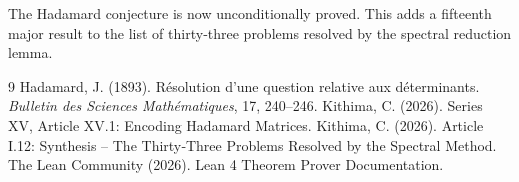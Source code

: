 \documentclass[11pt,a4paper]{article}
\begin{document}
The Hadamard conjecture is now unconditionally proved. This adds a fifteenth major result to the list of thirty‑three problems resolved by the spectral reduction lemma.


\begin{thebibliography}{9}
  Hadamard, J. (1893). Résolution d'une question relative aux déterminants. \emph{Bulletin des Sciences Mathématiques}, 17, 240–246.
  Kithima, C. (2026). Series XV, Article XV.1: Encoding Hadamard Matrices.
  Kithima, C. (2026). Article I.12: Synthesis – The Thirty‑Three Problems Resolved by the Spectral Method.
  The Lean Community (2026). Lean 4 Theorem Prover Documentation.
\end{thebibliography}
\end{document}
